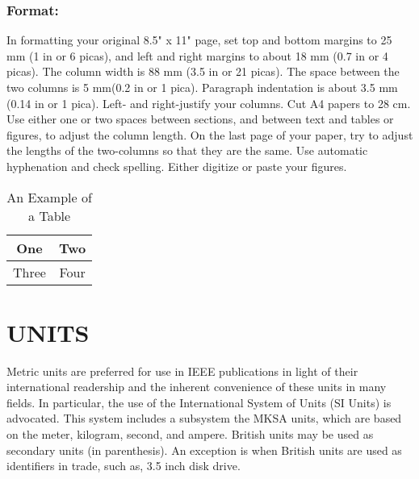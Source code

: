 \documentclass[a4paper, 10pt, conference]{ieeeconf}      %
\begin{document}
\subsubsection{Format:} In formatting your original 8.5" x 11" page, set top and
bottom margins to 25 mm (1 in or 6 picas), and left and right margins
to about 18 mm (0.7 in or 4 picas). The column width is 88 mm (3.5 in or 21 picas).
 The space between the two columns is 5 mm(0.2 in or 1 pica). Paragraph
 indentation is about 3.5 mm (0.14 in or 1 pica). Left- and right-justify your
 columns. Cut A4 papers to 28 cm. Use either one or two spaces between sections,
 and between text and tables or figures, to adjust the column length.
  On the last page of your paper, try to adjust the lengths of the
  two-columns so that they are the same. Use automatic hyphenation and
   check spelling. Either digitize or paste your figures.

\begin{table}
\caption{An Example of a Table}
\label{table_example}
\begin{center}
\begin{tabular}{|c||c|}
\hline
One & Two\\
\hline
Three & Four\\
\hline
\end{tabular}
\end{center}
\end{table}


\section{UNITS}

Metric units are preferred for use in IEEE publications in light of their
international readership and the inherent convenience of these units in many fields.
In particular, the use of the International System of Units (SI Units) is advocated.
 This system includes a subsystem the MKSA units, which are based on the
 meter, kilogram, second, and ampere. British units may be used as secondary units
 (in parenthesis). An exception is when British units are used as identifiers in trade,
 such as, 3.5 inch disk drive.


\addtolength{\textheight}{-3cm}   %
\end{document}
